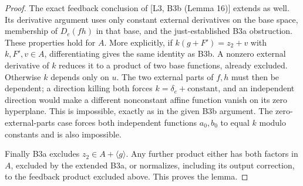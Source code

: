 \documentclass[11pt,a4paper]{article}
\begin{document}
\begin{proof}
The exact feedback conclusion of [L3, B3b (Lemma 16)] extends as well. Its derivative argument uses only constant external derivatives on the base space, membership of $D_e(fh)$ in that base, and the just-established B3a obstruction. These properties hold for $A$. More explicitly, if $k(g+F')=z_2+v$ with $k,F',v\in A$, differentiating gives the same identity as B3b. A nonzero external derivative of $k$ reduces it to a product of two base functions, already excluded. Otherwise $k$ depends only on $u$. The two external parts of $f,h$ must then be dependent; a direction killing both forces $k=\delta_e+\text{constant}$, and an independent direction would make a different nonconstant affine function vanish on its zero hyperplane. This is impossible, exactly as in the given B3b argument. The zero-external-parts case forces both independent functions $a_0,b_0$ to equal $k$ modulo constants and is also impossible.

Finally B3a excludes $z_2\in A+\langle g\rangle$. Any further product either has both factors in $A$, excluded by the extended B3a, or normalizes, including its output correction, to the feedback product excluded above. This proves the lemma.
\end{proof}
\end{document}
